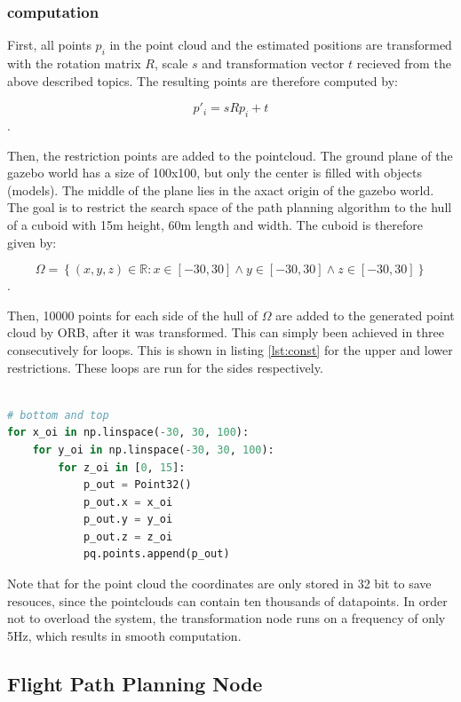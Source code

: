 	\subsubsection{computation}
	
	First, all points $p_i$ in the point cloud and the estimated positions are transformed with the rotation matrix $R$, scale $s$ and transformation vector $t$ recieved 
	from the above described topics. The resulting points are therefore computed by: 
	
	$$p'_i = sRp_i + t$$.
	
	Then, the restriction points are added to the pointcloud.
	The ground plane of the gazebo world has a size of 100x100, but only the center is filled with objects (models). The middle of the plane 
	lies in the axact origin of the gazebo world. The goal is to restrict the search space of the path planning algorithm to the hull of a cuboid with 15m
	height, 60m length and width. The cuboid is therefore given by: 
	
	$$\Omega = \left\{(x, y, z) \in \mathbb{R} : x \in \left[-30, 30\right] \land y \in \left[-30, 30\right] \land z \in \left[-30, 30\right] \right\}$$.
	
	Then, 10000 points for each side of the hull of $\Omega$ are added to the generated point cloud by ORB, after it was transformed. This can simply been achieved 
	in three consecutively for loops. This is shown in listing \ref{lst:const} for the upper and lower restrictions. These loops are run for the sides respectively. 
	
	\begin{lstlisting}[language=python, caption= Adding upper and lower restrictions to point cloud. , label=lst:const]
	
# bottom and top 
for x_oi in np.linspace(-30, 30, 100): 
	for y_oi in np.linspace(-30, 30, 100): 
		for z_oi in [0, 15]: 
			p_out = Point32()
			p_out.x = x_oi
			p_out.y = y_oi
			p_out.z = z_oi
			pq.points.append(p_out)

	\end{lstlisting}

	Note that for the point cloud the coordinates are only stored in 32 bit to save resouces, since the pointclouds can contain ten thousands of datapoints. In order not 
	to overload the system, the transformation node runs on a frequency of only 5Hz, which results in smooth computation. 
	
	\subsection{Flight Path Planning Node} \label{path}
	
